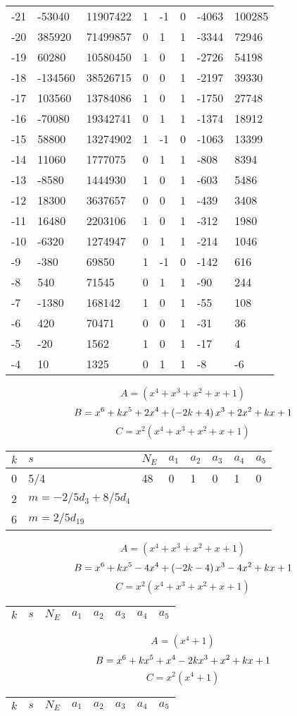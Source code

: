 \documentclass{amsart}
\begin{document}
\begin{longtable}{|l|l|l|lllll|}
-21&-53040&11907422&1&-1&0&-4063&100285\\
-20&385920&71499857&0&1&1&-3344&72946\\
-19&60280&10580450&1&0&1&-2726&54198\\
-18&-134560&38526715&0&0&1&-2197&39330\\
-17&103560&13784086&1&0&1&-1750&27748\\
-16&-70080&19342741&0&1&1&-1374&18912\\
-15&58800&13274902&1&-1&0&-1063&13399\\
-14&11060&1777075&0&1&1&-808&8394\\
-13&-8580&1444930&1&0&1&-603&5486\\
-12&18300&3637657&0&0&1&-439&3408\\
-11&16480&2203106&1&0&1&-312&1980\\
-10&-6320&1274947&0&1&1&-214&1046\\
-9&-380&69850&1&-1&0&-142&616\\
-8&540&71545&0&1&1&-90&244\\
-7&-1380&168142&1&0&1&-55&108\\
-6&420&70471&0&0&1&-31&36\\
-5&-20&1562&1&0&1&-17&4\\
-4&10&1325&0&1&1&-8&-6\\
\hline
\end{longtable}
$$A=(x^4
 + x^3
 + x^2
 + x
 + 1)$$
$$B=x^6
 + k\*x^5
 + 2\*x^4
 + \left(-2\*k
 + 4\right) \*x^3
 + 2\*x^2
 + k\*x
 + 1$$
$$C=x^2(x^4
 + x^3
 + x^2
 + x
 + 1)$$
\begin{longtable}{|l|l|l|lllll|}
\hline
$k$ & $s$ & $N_E$ & $a_1$ & $a_2$ & $a_3$ & $a_4$ & $a_5$\\
\hline
0&5/4&48&0&1&0&1&0\\
2&$m=-2/5d_{3}+8/5d_{4}$&&\multicolumn{5}{c|}{}\\
6&$m=2/5d_{19}$&&\multicolumn{5}{c|}{}\\
\hline
\end{longtable}
$$A=(x^4
 + x^3
 + x^2
 + x
 + 1)$$
$$B=x^6
 + k\*x^5
 - 4\*x^4
 + \left(-2\*k
 - 4\right) \*x^3
 - 4\*x^2
 + k\*x
 + 1$$
$$C=x^2(x^4
 + x^3
 + x^2
 + x
 + 1)$$
\begin{longtable}{|l|l|l|lllll|}
\hline
$k$ & $s$ & $N_E$ & $a_1$ & $a_2$ & $a_3$ & $a_4$ & $a_5$\\
\hline
\hline
\end{longtable}
$$A=(x^4
 + 1)$$
$$B=x^6
 + k\*x^5
 + x^4
 - 2\*k\*x^3
 + x^2
 + k\*x
 + 1$$
$$C=x^2(x^4
 + 1)$$
\begin{longtable}{|l|l|l|lllll|}
\hline
$k$ & $s$ & $N_E$ & $a_1$ & $a_2$ & $a_3$ & $a_4$ & $a_5$\\
\hline
\hline
\end{longtable}
\end{document}
